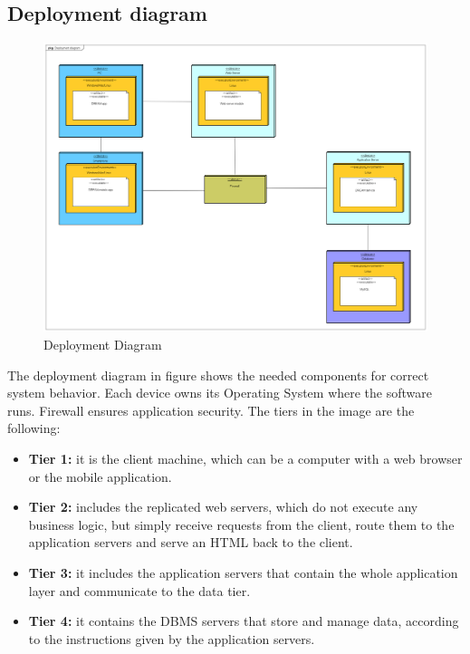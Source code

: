 \newpage
\subsection{Deployment diagram}
\begin{figure}[H]
    \begin{center}
        \includegraphics[width=\textwidth]{Images/DeploymentDiagram.png}
        \caption{Deployment Diagram}
    \end{center}
\end{figure}

The deployment diagram in figure shows the needed components for correct system behavior.
Each device owns its Operating System where the software runs. Firewall ensures application security.
\newline The tiers in the image are the following:
\begin{itemize}
    \item \textbf{Tier 1:} it is the client machine, which can be a computer with a web browser or the mobile
    application.
    \item \textbf{Tier 2:} includes the replicated web servers, which do not execute any business logic, but simply receive
    requests from the client, route them to the application servers and serve an HTML back to the client.
    \item \textbf{Tier 3:} it includes the application servers that contain the whole application layer and communicate to the data tier.
    \item \textbf{Tier 4:} it contains the DBMS servers that store and manage data, according to the instructions given by the application servers.
\end{itemize}


